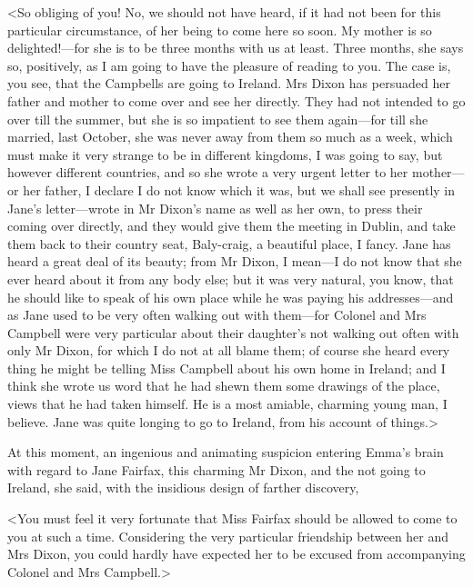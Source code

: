 <So obliging of you! No, we should not have heard, if it had not been for this particular circumstance, of her being to come here so soon. My mother is so delighted!—for she is to be three months with us at least. Three months, she says so, positively, as I am going to have the pleasure of reading to you. The case is, you see, that the Campbells are going to Ireland. Mrs Dixon has persuaded her father and mother to come over and see her directly. They had not intended to go over till the summer, but she is so impatient to see them again—for till she married, last October, she was never away from them so much as a week, which must make it very strange to be in different kingdoms, I was going to say, but however different countries, and so she wrote a very urgent letter to her mother—or her father, I declare I do not know which it was, but we shall see presently in Jane's letter—wrote in Mr Dixon's name as well as her own, to press their coming over directly, and they would give them the meeting in Dublin, and take them back to their country seat, Baly-craig, a beautiful place, I fancy. Jane has heard a great deal of its beauty; from Mr Dixon, I mean—I do not know that she ever heard about it from any body else; but it was very natural, you know, that he should like to speak of his own place while he was paying his addresses—and as Jane used to be very often walking out with them—for Colonel and Mrs Campbell were very particular about their daughter's not walking out often with only Mr Dixon, for which I do not at all blame them; of course she heard every thing he might be telling Miss Campbell about his own home in Ireland; and I think she wrote us word that he had shewn them some drawings of the place, views that he had taken himself. He is a most amiable, charming young man, I believe. Jane was quite longing to go to Ireland, from his account of things.>

At this moment, an ingenious and animating suspicion entering Emma's brain with regard to Jane Fairfax, this charming Mr Dixon, and the not going to Ireland, she said, with the insidious design of farther discovery,

<You must feel it very fortunate that Miss Fairfax should be allowed to come to you at such a time. Considering the very particular friendship between her and Mrs Dixon, you could hardly have expected her to be excused from accompanying Colonel and Mrs Campbell.>


